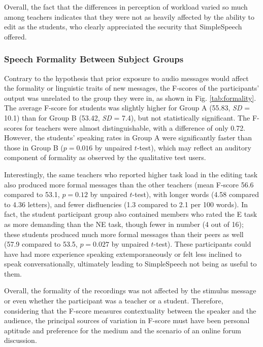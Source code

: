 Overall, the fact that the differences in perception of workload varied so much among teachers indicates that they were not as heavily affected by the ability to edit as the students, who clearly appreciated the security that SimpleSpeech offered.

\subsubsection{Speech Formality Between Subject Groups}
Contrary to the hypothesis that prior exposure to audio messages would affect the formality or linguistic traits of new messages, the F-scores of the participants' output was unrelated to the group they were in, as shown in Fig. \ref{tab:formality}.
The average F-score for students was slightly higher for Group A (55.83, \textit{SD} = 10.1) than for Group B (53.42, \textit{SD} = 7.4), but not statistically significant. 
The F-scores for teachers were almost distinguishable, with a difference of only 0.72.
However, the students' speaking rates in Group A were significantly faster than those in Group B ($p=0.016$ by unpaired $t$-test), which may reflect an auditory component of formality as observed by the qualitative test users.

Interestingly, the same teachers who reported higher task load in the editing task also produced more formal messages than the other teachers (mean F-score 56.6 compared to 53.1, $p=0.12$ by unpaired $t$-test), with longer words (4.58 compared to 4.36 letters), and fewer disfluencies (1.3 compared to 2.1 per 100 words).
In fact, the student participant group also contained members who rated the E task as more demanding than the NE task, though fewer in number (4 out of 16); these students produced much more formal messages than their peers as well (57.9 compared to 53.5,  $p=0.027$ by unpaired $t$-test). 
These participants could have had more experience speaking extemporaneously or felt less inclined to speak conversationally, ultimately leading to SimpleSpeech not being as useful to them.

Overall, the formality of the recordings was not affected by the stimulus message or even whether the participant was a teacher or a student.
Therefore, considering that the F-score measures contextuality between the speaker and the audience, the principal sources of variation in F-score must have been personal aptitude and preference for the medium and the scenario of an online forum discussion.

